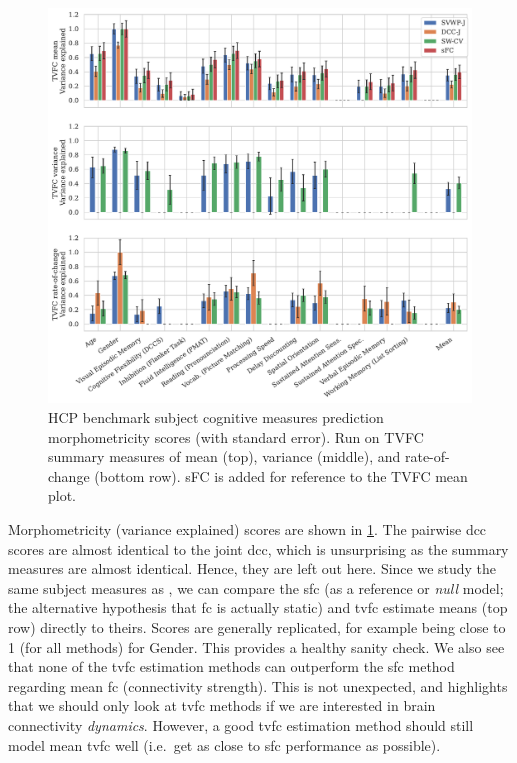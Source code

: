 \begin{figure}[t]
  \centering
  \includegraphics[width=\textwidth]{fig/hcp/d15/subject_measure_prediction/cognitive/morphometricity_all_TVFC_summary_measures}
  \caption{
    HCP benchmark subject cognitive measures prediction morphometricity scores (with standard error).
    Run on TVFC summary measures of mean (top), variance (middle), and rate-of-change (bottom row).
    sFC is added for reference to the TVFC mean plot.
  }
  \label{fig:hcp-results-subject-measures-prediction}
\end{figure}


Morphometricity (variance explained) scores are shown in \cref{fig:hcp-results-subject-measures-prediction}.
The pairwise \gls{dcc} scores are almost identical to the joint \gls{dcc}, which is unsurprising as the summary measures are almost identical.
Hence, they are left out here.
%
Since we study the same subject measures as \textcite{Li2019a}, we can compare the \gls{sfc} (as a reference or \emph{null} model; the alternative hypothesis that \gls{fc} is actually static) and \gls{tvfc} estimate means (top row) directly to theirs.
Scores are generally replicated, for example being close to 1 (for all methods) for Gender.
This provides a healthy sanity check.
%
We also see that none of the \gls{tvfc} estimation methods can outperform the \gls{sfc} method regarding mean \gls{fc} (connectivity strength).
This is not unexpected, and highlights that we should only look at \gls{tvfc} methods if we are interested in brain connectivity \emph{dynamics}.
However, a good \gls{tvfc} estimation method should still model mean \gls{tvfc} well (i.e.~get as close to \gls{sfc} performance as possible).

